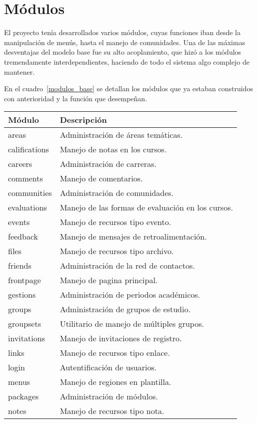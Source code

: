 \section{Módulos}
El proyecto tenía desarrollados varios módulos, cuyas funciones iban desde la manipulación de menús, hasta el manejo de
comunidades. Una de las máximas desventajas del modelo base fue su alto acoplamiento, que hizó a los módulos
tremendamente interdependientes, haciendo de todo el sistema algo complejo de mantener.

En el cuadro~\ref{modulos_base} se detallan los módulos que ya estaban construidos con anterioridad y la función que
desempeñan.

\begin{table}
\begin{tabular}{l|l}
Módulo & Descripción \\
\hline
areas & Administración de áreas temáticas. \\
califications & Manejo de notas en los cursos. \\
careers & Administración de carreras. \\
comments & Manejo de comentarios. \\
communities & Administración de comunidades. \\
evaluations & Manejo de las formas de evaluación en los cursos. \\
events & Manejo de recursos tipo evento. \\
feedback & Manejo de mensajes de retroalimentación. \\
files & Manejo de recursos tipo archivo. \\
friends & Administración de la red de contactos. \\
frontpage & Manejo de pagina principal. \\
gestions & Administración de periodos académicos. \\
groups & Administración de grupos de estudio. \\
groupsets & Utilitario de manejo de múltiples grupos. \\
invitations & Manejo de invitaciones de registro. \\
links & Manejo de recursos tipo enlace. \\
login & Autentificación de usuarios. \\
menus & Manejo de regiones en plantilla. \\
packages & Administración de módulos. \\
notes & Manejo de recursos tipo nota. \\

\end{tabular}
\end{table}
